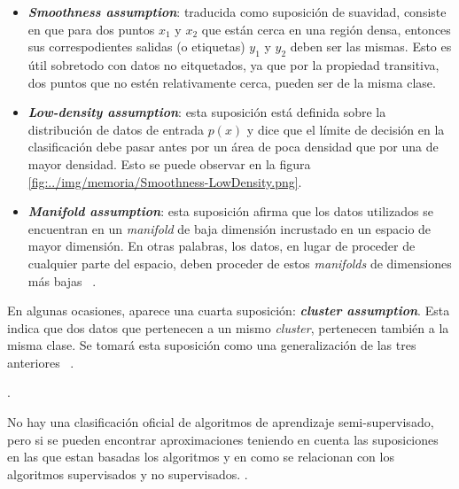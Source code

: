 \begin{itemize}
	\item \textit{\textbf{Smoothness assumption}}: traducida como suposición de suavidad, consiste en que para dos puntos $x_{1}$ y $x_{2}$ que están cerca en una región densa, entonces sus correspodientes salidas (o etiquetas) $y_{1}$ y $y_{2}$ deben ser las mismas. Esto es útil sobretodo con datos no eitquetados, ya que por la propiedad transitiva, dos puntos que no estén relativamente cerca, pueden ser de la misma clase.
	\item \textit{\textbf{Low-density assumption}}: esta suposición está definida sobre la distribución de datos de entrada $p(x)$ y dice que el límite de decisión en la clasificación debe pasar antes por un área de poca densidad que por una de mayor densidad. Esto se puede observar en la figura \ref{fig:../img/memoria/Smoothness-LowDensity.png}.

	
	
	\item \textit{\textbf{Manifold assumption}}: esta suposición afirma que los datos utilizados se encuentran en un \textit{manifold} de baja dimensión incrustado en un espacio de mayor dimensión. En otras palabras, los datos, en lugar de proceder de cualquier parte del espacio, deben proceder de estos \textit{manifolds} de dimensiones más bajas ~\cite{web:assumptions}.
\end{itemize}

En algunas ocasiones, aparece una cuarta suposición: \textit{\textbf{cluster assumption}}. Esta indica que dos datos que pertenecen a un mismo \textit{cluster}, pertenecen también a la misma clase. Se tomará esta suposición como una generalización de las tres anteriores ~\cite{Engelen:semi-supervised}.

.

No hay una clasificación oficial de algoritmos de aprendizaje semi-supervisado, pero si se pueden encontrar aproximaciones teniendo en cuenta las suposiciones en las que estan basadas los algoritmos y en como se relacionan con los algoritmos supervisados y no supervisados.
.

